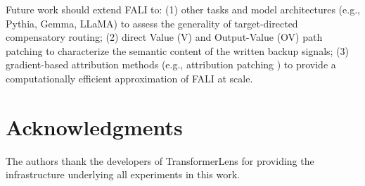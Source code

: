 \documentclass[12pt,a4paper]{article}
\begin{document}
Future work should extend FALI to: (1) other tasks and model architectures
(e.g., Pythia, Gemma, LLaMA) to assess the generality of target-directed compensatory routing;
(2) direct Value (V) and Output-Value (OV) path patching to characterize the
semantic content of the written backup signals; (3) gradient-based attribution
methods (e.g., attribution patching \citep{nanda2023attribution}) to provide a
computationally efficient approximation of FALI at scale.

\section*{Acknowledgments}

The authors thank the developers of TransformerLens \citep{nanda2022transformerlens}
for providing the infrastructure underlying all experiments in this work.



\end{document}
